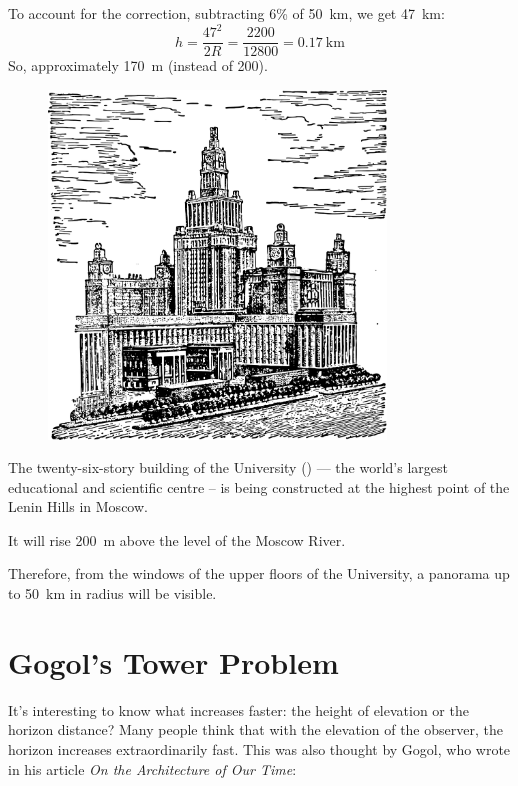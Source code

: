 To account for the correction, subtracting 6\% of \SI{50}{\kilo\meter}, we get \SI{47}{\kilo\meter}:
\begin{equation*}%
h = \frac{47^{2}}{2R} = \frac{2200}{12800} = \SI{0.17}{\kilo\meter}
\end{equation*}
So, approximately \SI{170}{\meter} (instead of 200).
\begin{figure}[h!]
\centering
\includegraphics[width=0.8\textwidth]{figures/ch-06/fig-104.pdf}
\end{figure}


The twenty-six-story building of the University () — the world's largest educational and scientific centre -- is being constructed at the highest point of the Lenin Hills in Moscow.

It will rise \SI{200}{\meter} above the level of the Moscow River.

Therefore, from the windows of the upper floors of the University, a panorama up to \SI{50}{\kilo\meter} in radius will be visible.


\section{Gogol's Tower Problem}
\label{sec-6.4}

It's interesting to know what increases faster: the height of elevation or the horizon distance? Many people think that with the elevation of the observer, the horizon increases extraordinarily fast. This was also thought by Gogol, who wrote in his article \emph{On the Architecture of Our Time}:

